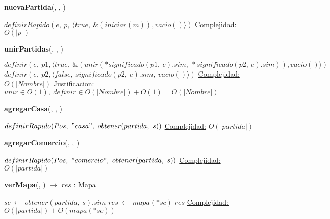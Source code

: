 \begin{Algoritmos}
    \begin{algorithm}[H]{\textbf{nuevaPartida}(, , )}
        \begin{algorithmic}[1]
            \State $definirRapido(e,\ p,\ \langle true,\ \&(iniciar(m)), vacio() \rangle )$ 
            \medskip
            \Statex \underline{Complejidad:} $O(|p|)$
        \end{algorithmic}
    \end{algorithm}

    \begin{algorithm}[H]{\textbf{unirPartidas}(, , )}
        \begin{algorithmic}[1]
            \State $definir(e,\ p1, \langle true,\ \&(unir(*significado(p1,\ e).sim,\ *significado(p2,\ e).sim)), vacio()\rangle)$
            \State $definir(e,\ p2, \langle false,\ significado(p2,\ e).sim,\ vacio() \rangle)$
            \medskip
            \Statex \underline{Complejidad:} $O(|Nombre|)$
            \Statex \underline{Justificacion:} $unir \in O(1),\ definir \in O(|Nombre|) + O(1) = O(|Nombre|)$
        \end{algorithmic}
    \end{algorithm}

    \begin{algorithm}[H]{\textbf{agregarCasa}(, , )} %
    \begin{algorithmic}[1]
        \State $definirRapido(Pos,\ "casa",\ obtener(partida,\ s))$
        \medskip
        \Statex \underline{Complejidad:} $O(|partida|)$
    \end{algorithmic}
    \end{algorithm}
    
    \begin{algorithm}[H]{\textbf{agregarComercio}(, , )} %
    \begin{algorithmic}[1]
        \State $definirRapido(Pos,\ "comercio",\ obtener(partida,\ s))$ 
        \medskip
        \Statex \underline{Complejidad:} $O(|partida|)$
    \end{algorithmic}
    \end{algorithm}

    \begin{algorithm}[H]{\textbf{verMapa}(, ) $\to$ $res$ : Mapa}
    \begin{algorithmic}[1]
        \State $sc\ \leftarrow\ obtener(partida,\ s).sim$
        \State $res\ \leftarrow\ mapa(*sc)$ 
        \State \Return $res$
        \medskip
        \Statex \underline{Complejidad:} $O(|partida|) + O(mapa(*sc))$
    \end{algorithmic}
    \end{algorithm}
      

\end{Algoritmos}
